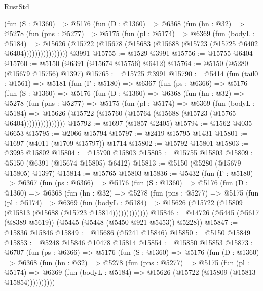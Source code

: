 \begin{lexlean}{RustStd}
\begin{coremodule}
            (fun (S : @1360) =>
            @5176
              (fun (D : @1360) =>
              @6368
                (fun (hn : @32) =>
                @5278
                  (fun (pns : @5277) =>
                  @5175
                    (fun (pl : @5174) =>
                    @6369
                      (fun (bodyL : @5184) =>
                      @15626
                        (@15722 (@15678 (@15683 (@15688 (@15723 (@15725 @6402 @6404))))))))))))))))
    @3991
@15755 := @1529 @3991
@15756 := @15755 @6404
@15760 := @5150 (@6391 (@15674 @15756) @6412)
@15764 := @5150 (@5280 (@15679 @15756) @1397)
@15765 := @15725 @3991
@15790 := @5414
    (fun (tail0 : @1561) =>
    @5181
      (fun (Γ : @5180) =>
      @6367
        (fun (ps : @6366) =>
        @5176
          (fun (S : @1360) =>
          @5176
            (fun (D : @1360) =>
            @6368
              (fun (hn : @32) =>
              @5278
                (fun (pns : @5277) =>
                @5175
                  (fun (pl : @5174) =>
                  @6369
                    (fun (bodyL : @5184) =>
                    @15626 (@15722 (@15760 (@15764 (@15688 (@15723 (@15765 @6404)))))))))))))))
@15792 := @1697 (@1857 @2405)
@15794 := @1562 @4035 @6653
@15795 := @2066 @15794
@15797 := @2419 @15795 @1431
@15801 := @1697 (@4011 (@1709 @15797)) @1714
@15802 := @15792 @15801
@15803 := @3995 @15802
@15804 := @15790 @15803
@15805 := @15755 @15803
@15809 := @5150 (@6391 (@15674 @15805) @6412)
@15813 := @5150 (@5280 (@15679 @15805) @1397)
@15814 := @15765 @15803
@15836 := @5432
    (fun (Γ : @5180) =>
    @6367
      (fun (ps : @6366) =>
      @5176
        (fun (S : @1360) =>
        @5176
          (fun (D : @1360) =>
          @6368
            (fun (hn : @32) =>
            @5278
              (fun (pns : @5277) =>
              @5175
                (fun (pl : @5174) =>
                @6369
                  (fun (bodyL : @5184) =>
                  @15626 (@15722 (@15809 (@15813 (@15688 (@15723 @15814)))))))))))))
@15846 := @14726 (@5445 (@5617 (@8389 @5619)) (@5445 (@5448 (@5450 @921 @5453)) @5228))
@15847 := @15836 @15846
@15849 := @15686 (@5241 @15846)
@15850 := @5150 @15849
@15853 := @5248 @15846 @10478 @15814
@15854 := @15850 @15853
@15873 := @6707
    (fun (ps : @6366) =>
    @5176
      (fun (S : @1360) =>
      @5176
        (fun (D : @1360) =>
        @6368
          (fun (hn : @32) =>
          @5278
            (fun (pns : @5277) =>
            @5175
              (fun (pl : @5174) =>
              @6369 (fun (bodyL : @5184) => @15626 (@15722 (@15809 (@15813 @15854))))))))))

\end{coremodule}
\end{lexlean}
